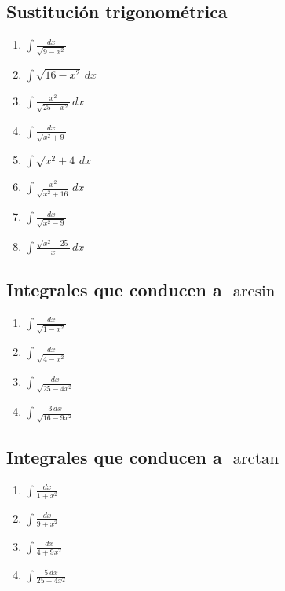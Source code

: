 \documentclass[12pt]{article}
\theoremstyle{definition}
\theoremstyle{remark}
\begin{document}
\subsection{Sustitución trigonométrica}
\begin{enumerate}[label=\arabic*.,start=161]
\item $\displaystyle \int \frac{dx}{\sqrt{9-x^2}}$
\item $\displaystyle \int \sqrt{16-x^2}\,dx$
\item $\displaystyle \int \frac{x^2}{\sqrt{25-x^2}}\,dx$
\item $\displaystyle \int \frac{dx}{\sqrt{x^2+9}}$
\item $\displaystyle \int \sqrt{x^2+4}\,dx$
\item $\displaystyle \int \frac{x^2}{\sqrt{x^2+16}}\,dx$
\item $\displaystyle \int \frac{dx}{\sqrt{x^2-9}}$
\item $\displaystyle \int \frac{\sqrt{x^2-25}}{x}\,dx$
\end{enumerate}

\subsection{Integrales que conducen a $\arcsin$}
\begin{enumerate}[label=\arabic*.,start=169]
\item $\displaystyle \int \frac{dx}{\sqrt{1-x^2}}$
\item $\displaystyle \int \frac{dx}{\sqrt{4-x^2}}$
\item $\displaystyle \int \frac{dx}{\sqrt{25-4x^2}}$
\item $\displaystyle \int \frac{3\,dx}{\sqrt{16-9x^2}}$
\end{enumerate}

\subsection{Integrales que conducen a $\arctan$}
\begin{enumerate}[label=\arabic*.,start=173]
\item $\displaystyle \int \frac{dx}{1+x^2}$
\item $\displaystyle \int \frac{dx}{9+x^2}$
\item $\displaystyle \int \frac{dx}{4+9x^2}$
\item $\displaystyle \int \frac{5\,dx}{25+4x^2}$
\end{enumerate}
\end{document}
